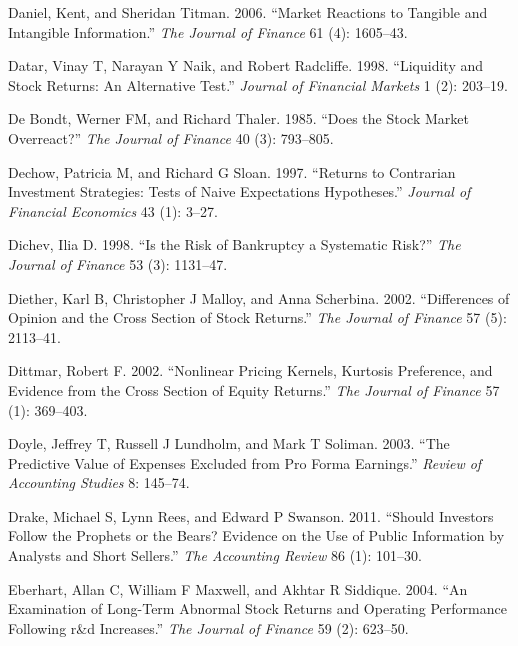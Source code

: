 \documentclass[
  letterpaper,
  DIV=11,
  numbers=noendperiod]{scrreprt}
\newlength{\cslhangindent}
\newlength{\cslentryspacingunit} %
\newenvironment{CSLReferences}[2] %
 {%
  \setlength{\parindent}{0pt}
  \ifodd #1
  \let\oldpar\par
  \def\par{\hangindent=\cslhangindent\oldpar}
  \fi
  \setlength{\parskip}{#2\cslentryspacingunit}
 }%
 {}
\begin{document}
\begin{CSLReferences}{1}{0}
\leavevmode{}%
Daniel, Kent, and Sheridan Titman. 2006. {``Market Reactions to Tangible
and Intangible Information.''} \emph{The Journal of Finance} 61 (4):
1605--43.

\leavevmode{}%
Datar, Vinay T, Narayan Y Naik, and Robert Radcliffe. 1998. {``Liquidity
and Stock Returns: An Alternative Test.''} \emph{Journal of Financial
Markets} 1 (2): 203--19.

\leavevmode{}%
De Bondt, Werner FM, and Richard Thaler. 1985. {``Does the Stock Market
Overreact?''} \emph{The Journal of Finance} 40 (3): 793--805.

\leavevmode{}%
Dechow, Patricia M, and Richard G Sloan. 1997. {``Returns to Contrarian
Investment Strategies: Tests of Naive Expectations Hypotheses.''}
\emph{Journal of Financial Economics} 43 (1): 3--27.

\leavevmode{}%
Dichev, Ilia D. 1998. {``Is the Risk of Bankruptcy a Systematic Risk?''}
\emph{The Journal of Finance} 53 (3): 1131--47.

\leavevmode{}%
Diether, Karl B, Christopher J Malloy, and Anna Scherbina. 2002.
{``Differences of Opinion and the Cross Section of Stock Returns.''}
\emph{The Journal of Finance} 57 (5): 2113--41.

\leavevmode{}%
Dittmar, Robert F. 2002. {``Nonlinear Pricing Kernels, Kurtosis
Preference, and Evidence from the Cross Section of Equity Returns.''}
\emph{The Journal of Finance} 57 (1): 369--403.

\leavevmode{}%
Doyle, Jeffrey T, Russell J Lundholm, and Mark T Soliman. 2003. {``The
Predictive Value of Expenses Excluded from Pro Forma Earnings.''}
\emph{Review of Accounting Studies} 8: 145--74.

\leavevmode{}%
Drake, Michael S, Lynn Rees, and Edward P Swanson. 2011. {``Should
Investors Follow the Prophets or the Bears? Evidence on the Use of
Public Information by Analysts and Short Sellers.''} \emph{The
Accounting Review} 86 (1): 101--30.

\leavevmode{}%
Eberhart, Allan C, William F Maxwell, and Akhtar R Siddique. 2004. {``An
Examination of Long-Term Abnormal Stock Returns and Operating
Performance Following r\&d Increases.''} \emph{The Journal of Finance}
59 (2): 623--50.


\end{CSLReferences}
\end{document}
